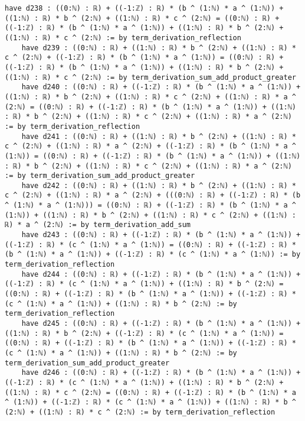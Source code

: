 \documentclass{article}
\begin{document}
\begin{tcolorbox}[colback=white!10, width=\linewidth]
\begin{lstlisting}[language=Lean4]
    have d238 : ((0:ℕ) : ℝ) + ((-1:ℤ) : ℝ) * (b ^ (1:ℕ) * a ^ (1:ℕ)) + ((1:ℕ) : ℝ) * b ^ (2:ℕ) + ((1:ℕ) : ℝ) * c ^ (2:ℕ) = ((0:ℕ) : ℝ) + ((-1:ℤ) : ℝ) * (b ^ (1:ℕ) * a ^ (1:ℕ)) + ((1:ℕ) : ℝ) * b ^ (2:ℕ) + ((1:ℕ) : ℝ) * c ^ (2:ℕ) := by term_derivation_reflection
    have d239 : ((0:ℕ) : ℝ) + ((1:ℕ) : ℝ) * b ^ (2:ℕ) + ((1:ℕ) : ℝ) * c ^ (2:ℕ) + ((-1:ℤ) : ℝ) * (b ^ (1:ℕ) * a ^ (1:ℕ)) = ((0:ℕ) : ℝ) + ((-1:ℤ) : ℝ) * (b ^ (1:ℕ) * a ^ (1:ℕ)) + ((1:ℕ) : ℝ) * b ^ (2:ℕ) + ((1:ℕ) : ℝ) * c ^ (2:ℕ) := by term_derivation_sum_add_product_greater
    have d240 : ((0:ℕ) : ℝ) + ((-1:ℤ) : ℝ) * (b ^ (1:ℕ) * a ^ (1:ℕ)) + ((1:ℕ) : ℝ) * b ^ (2:ℕ) + ((1:ℕ) : ℝ) * c ^ (2:ℕ) + ((1:ℕ) : ℝ) * a ^ (2:ℕ) = ((0:ℕ) : ℝ) + ((-1:ℤ) : ℝ) * (b ^ (1:ℕ) * a ^ (1:ℕ)) + ((1:ℕ) : ℝ) * b ^ (2:ℕ) + ((1:ℕ) : ℝ) * c ^ (2:ℕ) + ((1:ℕ) : ℝ) * a ^ (2:ℕ) := by term_derivation_reflection
    have d241 : ((0:ℕ) : ℝ) + ((1:ℕ) : ℝ) * b ^ (2:ℕ) + ((1:ℕ) : ℝ) * c ^ (2:ℕ) + ((1:ℕ) : ℝ) * a ^ (2:ℕ) + ((-1:ℤ) : ℝ) * (b ^ (1:ℕ) * a ^ (1:ℕ)) = ((0:ℕ) : ℝ) + ((-1:ℤ) : ℝ) * (b ^ (1:ℕ) * a ^ (1:ℕ)) + ((1:ℕ) : ℝ) * b ^ (2:ℕ) + ((1:ℕ) : ℝ) * c ^ (2:ℕ) + ((1:ℕ) : ℝ) * a ^ (2:ℕ) := by term_derivation_sum_add_product_greater
    have d242 : ((0:ℕ) : ℝ) + ((1:ℕ) : ℝ) * b ^ (2:ℕ) + ((1:ℕ) : ℝ) * c ^ (2:ℕ) + ((1:ℕ) : ℝ) * a ^ (2:ℕ) + (((0:ℕ) : ℝ) + ((-1:ℤ) : ℝ) * (b ^ (1:ℕ) * a ^ (1:ℕ))) = ((0:ℕ) : ℝ) + ((-1:ℤ) : ℝ) * (b ^ (1:ℕ) * a ^ (1:ℕ)) + ((1:ℕ) : ℝ) * b ^ (2:ℕ) + ((1:ℕ) : ℝ) * c ^ (2:ℕ) + ((1:ℕ) : ℝ) * a ^ (2:ℕ) := by term_derivation_add_sum
    have d243 : ((0:ℕ) : ℝ) + ((-1:ℤ) : ℝ) * (b ^ (1:ℕ) * a ^ (1:ℕ)) + ((-1:ℤ) : ℝ) * (c ^ (1:ℕ) * a ^ (1:ℕ)) = ((0:ℕ) : ℝ) + ((-1:ℤ) : ℝ) * (b ^ (1:ℕ) * a ^ (1:ℕ)) + ((-1:ℤ) : ℝ) * (c ^ (1:ℕ) * a ^ (1:ℕ)) := by term_derivation_reflection
    have d244 : ((0:ℕ) : ℝ) + ((-1:ℤ) : ℝ) * (b ^ (1:ℕ) * a ^ (1:ℕ)) + ((-1:ℤ) : ℝ) * (c ^ (1:ℕ) * a ^ (1:ℕ)) + ((1:ℕ) : ℝ) * b ^ (2:ℕ) = ((0:ℕ) : ℝ) + ((-1:ℤ) : ℝ) * (b ^ (1:ℕ) * a ^ (1:ℕ)) + ((-1:ℤ) : ℝ) * (c ^ (1:ℕ) * a ^ (1:ℕ)) + ((1:ℕ) : ℝ) * b ^ (2:ℕ) := by term_derivation_reflection
    have d245 : ((0:ℕ) : ℝ) + ((-1:ℤ) : ℝ) * (b ^ (1:ℕ) * a ^ (1:ℕ)) + ((1:ℕ) : ℝ) * b ^ (2:ℕ) + ((-1:ℤ) : ℝ) * (c ^ (1:ℕ) * a ^ (1:ℕ)) = ((0:ℕ) : ℝ) + ((-1:ℤ) : ℝ) * (b ^ (1:ℕ) * a ^ (1:ℕ)) + ((-1:ℤ) : ℝ) * (c ^ (1:ℕ) * a ^ (1:ℕ)) + ((1:ℕ) : ℝ) * b ^ (2:ℕ) := by term_derivation_sum_add_product_greater
    have d246 : ((0:ℕ) : ℝ) + ((-1:ℤ) : ℝ) * (b ^ (1:ℕ) * a ^ (1:ℕ)) + ((-1:ℤ) : ℝ) * (c ^ (1:ℕ) * a ^ (1:ℕ)) + ((1:ℕ) : ℝ) * b ^ (2:ℕ) + ((1:ℕ) : ℝ) * c ^ (2:ℕ) = ((0:ℕ) : ℝ) + ((-1:ℤ) : ℝ) * (b ^ (1:ℕ) * a ^ (1:ℕ)) + ((-1:ℤ) : ℝ) * (c ^ (1:ℕ) * a ^ (1:ℕ)) + ((1:ℕ) : ℝ) * b ^ (2:ℕ) + ((1:ℕ) : ℝ) * c ^ (2:ℕ) := by term_derivation_reflection

\end{lstlisting}
\end{tcolorbox}
\end{document}
